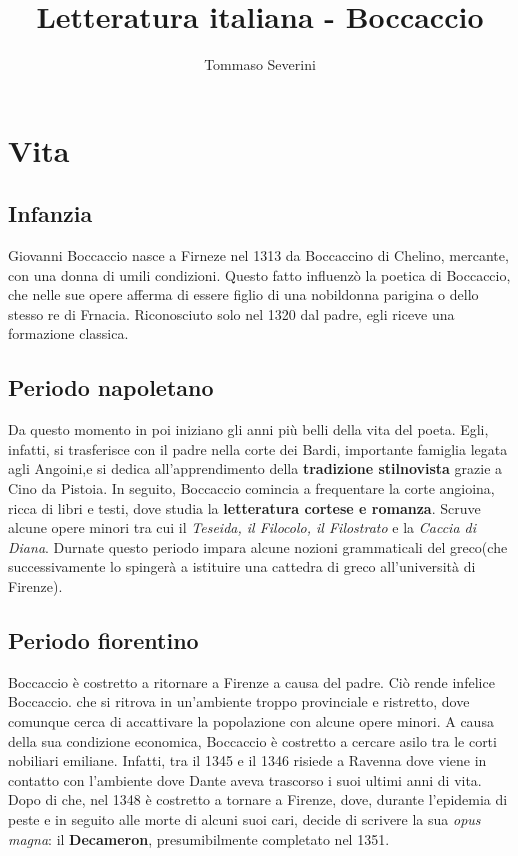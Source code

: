 \documentclass[10pt,a4paper]{article}
\author{Tommaso Severini}
\title{Letteratura italiana - Boccaccio}
\begin{document}
	\maketitle

	\section{Vita}

	\subsection{Infanzia}

	Giovanni Boccaccio nasce a Firneze nel 1313 da Boccaccino di Chelino, mercante, con una donna di umili condizioni. Questo fatto influenzò la poetica di Boccaccio, che nelle sue opere afferma di essere figlio di una nobildonna parigina o dello stesso re di Frnacia. Riconosciuto solo nel 1320 dal padre, egli riceve una formazione classica.

	\subsection{Periodo napoletano}

	 Da questo momento in poi iniziano gli anni più belli della vita del poeta. Egli, infatti, si trasferisce con il padre nella corte dei Bardi, importante famiglia legata agli Angoini,e si dedica all'apprendimento della \textbf{tradizione stilnovista} grazie a Cino da Pistoia. In seguito, Boccaccio comincia a frequentare la corte angioina, ricca di libri e testi, dove studia la \textbf{letteratura cortese e romanza}. Scruve alcune opere minori tra cui il \textit{Teseida, il Filocolo, il Filostrato} e la \textit{Caccia di Diana}. Durnate questo periodo impara alcune nozioni grammaticali del greco(che successivamente lo spingerà a istituire una cattedra di greco all'università di Firenze).

	 \subsection{Periodo fiorentino}

	 Boccaccio è costretto a ritornare a Firenze a causa del padre. Ciò rende infelice Boccaccio. che si ritrova in un'ambiente troppo provinciale e ristretto, dove comunque cerca di accattivare la popolazione con alcune opere minori.
	 A causa della sua condizione economica, Boccaccio è costretto a cercare asilo tra le corti nobiliari emiliane. Infatti, tra il 1345 e il 1346 risiede a Ravenna dove viene in contatto con l'ambiente dove Dante aveva trascorso i suoi ultimi anni di vita.
	 Dopo di che, nel 1348 è costretto a tornare a Firenze, dove, durante l'epidemia di peste e in seguito alle morte di alcuni suoi cari, decide di scrivere la sua \textit{opus magna}: il \textbf{Decameron}, presumibilmente completato nel 1351.
\end{document}
